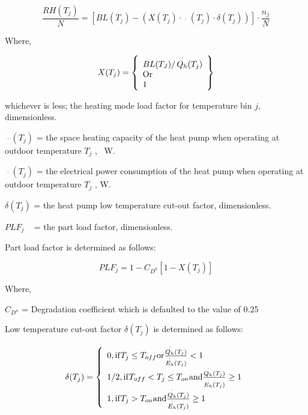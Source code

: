 \begin{equation}
\frac{{RH({T_j})}}{N} = \left[ {BL({T_j}) - \left( {X({T_j}) \cdot \mathop {{Q_h}}\limits^ \cdot  ({T_j}) \cdot \delta ({T_j})} \right)} \right] \cdot \frac{{{n_j}}}{N}
\end{equation}

Where,

\begin{equation}
X({T_j}) = \left\{ 
    \begin{array}{l}
      BL({T_J})/\mathop {{Q_h}}\limits^ \cdot  ({T_j}) \\
      {\rm{Or}} \\
      1
    \end{array}
  \right\}
\end{equation}

whichever is less; the heating mode load factor for temperature bin \(j\), dimensionless.

\(\mathop {{Q_h}}\limits^ \cdot ({T_j})\) = the space heating capacity of the heat pump when operating at outdoor temperature \({T_j}\) , ~W.

\(\mathop {{E_h}}\limits^ \cdot ({T_j})\) = the electrical power consumption of the heat pump when operating at outdoor temperature \({T_j}\) , W.

\(\delta ({T_j})\) = the heat pump low temperature cut-out factor, dimensionless.

\(PL{F_j}\) ~ = the part load factor, dimensionless.

Part load factor is determined as follows:

\begin{equation}
PL{F_j} = 1 - {C_{{D^h}}}[1 - X({T_j})]
\end{equation}

Where,

\({C_{{D^h}}}\) = Degradation coefficient which is defaulted to the value of 0.25

Low temperature cut-out factor \(\delta ({T_j})\) is determined as follows:

\begin{equation}
\delta ({T_j}) = \left\{ 
    \begin{array}{l}
      {\rm{0, if }}{T_j} \le {T_{off}}{\rm{ or }}\frac{{\mathop {{Q_h}}\limits^ \cdot  ({T_j})}}{{\mathop {{E_h}}\limits^ \cdot  ({T_j})}} < 1 \\
      {\rm{1/2, if }}{T_{off}} < {T_j} \le {T_{on}}{\rm{ and }}\frac{{\mathop {{Q_h}}\limits^ \cdot  ({T_j})}}{{\mathop {{E_h}}\limits^ \cdot  ({T_j})}} \ge 1 \\
      {\rm{1, if }}{T_j} > {T_{on}}{\rm{ and }}\frac{{\mathop {{Q_h}}\limits^ \cdot  ({T_j})}}{{\mathop {{E_h}}\limits^ \cdot  ({T_j})}} \ge 1
    \end{array}
  \right.
\end{equation}

